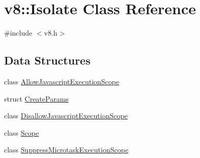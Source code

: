 \hypertarget{classv8_1_1Isolate}{}\section{v8\+:\+:Isolate Class Reference}
\label{classv8_1_1Isolate}


{\ttfamily \#include $<$v8.\+h$>$}

\subsection*{Data Structures}
\begin{DoxyCompactItemize}
\item 
class \hyperlink{classv8_1_1Isolate_1_1AllowJavascriptExecutionScope}{Allow\+Javascript\+Execution\+Scope}
\item 
struct \hyperlink{structv8_1_1Isolate_1_1CreateParams}{Create\+Params}
\item 
class \hyperlink{classv8_1_1Isolate_1_1DisallowJavascriptExecutionScope}{Disallow\+Javascript\+Execution\+Scope}
\item 
class \hyperlink{classv8_1_1Isolate_1_1Scope}{Scope}
\item 
class \hyperlink{classv8_1_1Isolate_1_1SuppressMicrotaskExecutionScope}{Suppress\+Microtask\+Execution\+Scope}
\end{DoxyCompactItemize}
